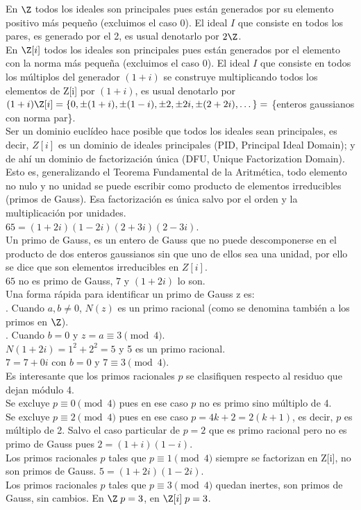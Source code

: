 En $\Z$ todos los ideales son principales pues están generados por su elemento positivo más pequeño (excluimos el caso 0). El ideal $I$ que consiste en todos los pares, es generado por el 2, es usual denotarlo por $2\Z$. \\
En $\Z[i]$ todos los ideales son principales pues están generados por el elemento con la norma más pequeña (excluimos el caso 0). El ideal $I$ que consiste en todos los múltiplos del generador $(1+i)$ se construye multiplicando todos los elementos de Z[i] por $(1+i)$, es usual denotarlo por $(1+i)\Z[i] = \{0,\pm(1+i), \pm(1-i),\pm2,\pm2i,\pm(2+2i), \dots \} =$ \{enteros gaussianos con norma par\}. \\
Ser un dominio euclídeo hace posible que todos los ideales sean principales, es decir, $Z[i]$ es un dominio de ideales principales (PID, Principal Ideal Domain); y de ahí un dominio de factorización única (DFU, Unique Factorization Domain). Esto es, generalizando el Teorema Fundamental de la Aritmética, todo elemento no nulo y no unidad se puede escribir como producto de elementos irreducibles (primos de Gauss). Esa factorización es única salvo por el orden y la multiplicación por unidades.\\
$65 = (1 + 2i)(1 - 2i)(2 + 3i)(2 - 3i)$. \\
Un primo de Gauss, es un entero de Gauss que no puede descomponerse en el producto de dos enteros gaussianos sin que uno de ellos sea una unidad, por ello se dice que son elementos irreducibles en $Z[i]$. \\
$65$ no es primo de Gauss, $7$ y $(1+2i)$ lo son. \\
Una forma rápida para identificar un primo de Gauss z es: \\
. Cuando $a,b \neq 0$, $N(z)$ es un primo racional (como se denomina también a los primos en $\Z$). \\
. Cuando $b = 0$ y $z=a \equiv 3 \pmod 4$. \\
$N(1+2i)=1^2+2^2=5$ y 5 es un primo racional. \\
$7 = 7+0i$ con $b=0$ y $7 \equiv 3 \pmod 4$. \\
Es interesante que los primos racionales $p$ se clasifiquen respecto al residuo que dejan módulo 4. \\
Se excluye $p \equiv 0 \pmod 4$ pues en ese caso $p$ no es primo sino múltiplo de 4. \\
Se excluye $p \equiv 2 \pmod 4$ pues en ese caso $p = 4k+2 = 2(k+1)$, es decir, $p$ es múltiplo de 2.  Salvo el caso particular de $p=2$ que es primo racional pero no es primo de Gauss pues $2 = (1+i)(1-i)$.\\
Los primos racionales $p$ tales que $p \equiv 1 \pmod 4$ siempre se factorizan en Z[i], no son primos de Gauss. $5 = (1+2i)(1-2i)$. \\
Los primos racionales $p$ tales que $p \equiv 3 \pmod 4$ quedan inertes, son primos de Gauss, sin cambios. En $\Z \; p = 3$, en $\Z[i] \; p = 3$. \\

